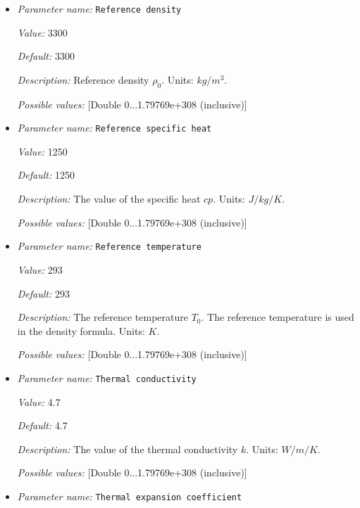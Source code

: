 \begin{itemize}
\item {\it Parameter name:} {\tt Reference density}
\label{parameters:Material model/Simpler model/Reference density}


{\it Value:} 3300


{\it Default:} 3300


{\it Description:} Reference density $\rho_0$. Units: $kg/m^3$.


{\it Possible values:} [Double 0...1.79769e+308 (inclusive)]
\item {\it Parameter name:} {\tt Reference specific heat}
\label{parameters:Material model/Simpler model/Reference specific heat}


{\it Value:} 1250


{\it Default:} 1250


{\it Description:} The value of the specific heat $cp$. Units: $J/kg/K$.


{\it Possible values:} [Double 0...1.79769e+308 (inclusive)]
\item {\it Parameter name:} {\tt Reference temperature}
\label{parameters:Material model/Simpler model/Reference temperature}


{\it Value:} 293


{\it Default:} 293


{\it Description:} The reference temperature $T_0$. The reference temperature is used in the density formula. Units: $K$.


{\it Possible values:} [Double 0...1.79769e+308 (inclusive)]
\item {\it Parameter name:} {\tt Thermal conductivity}
\label{parameters:Material model/Simpler model/Thermal conductivity}


{\it Value:} 4.7


{\it Default:} 4.7


{\it Description:} The value of the thermal conductivity $k$. Units: $W/m/K$.


{\it Possible values:} [Double 0...1.79769e+308 (inclusive)]
\item {\it Parameter name:} {\tt Thermal expansion coefficient}
\label{parameters:Material model/Simpler model/Thermal expansion coefficient}



\end{itemize}
